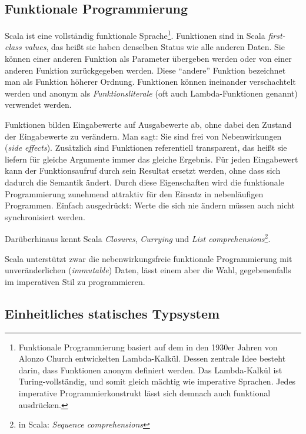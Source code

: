 \documentclass[a4paper, 12pt, hidelinks, listof=totoc, listoftables=totoc, bibliography=totoc]{scrreprt}
\begin{document}
\subsection{Funktionale Programmierung}


Scala ist eine vollständig funktionale Sprache\footnote{Funktionale Programmierung basiert auf dem in den 1930er Jahren von Alonzo Church entwickelten Lambda-Kalkül. Dessen zentrale Idee besteht darin, dass Funktionen anonym definiert werden. Das Lambda-Kalkül ist Turing-vollständig, und somit gleich mächtig wie imperative Sprachen. Jedes imperative Programmierkonstrukt lässt sich demnach auch funktional ausdrücken.}. Funktionen sind in Scala \textit{first-class values}, das heißt sie haben denselben Status wie alle anderen Daten. Sie können einer anderen Funktion als Parameter übergeben werden oder von einer anderen Funktion zurückgegeben werden. Diese "`andere"' Funktion bezeichnet man als Funktion höherer Ordnung. Funktionen können ineinander verschachtelt werden und anonym als \textit{Funktionsliterale} (oft auch Lambda-Funktionen genannt) verwendet werden.

Funktionen bilden Eingabewerte auf Ausgabewerte ab, ohne dabei den Zustand der Eingabewerte zu verändern. Man sagt: Sie sind frei von Nebenwirkungen (\textit{side effects}). Zusätzlich sind Funktionen referentiell transparent, das heißt sie liefern für gleiche Argumente immer das gleiche Ergebnis. Für jeden Eingabewert kann der Funktionsaufruf durch sein Resultat ersetzt werden, ohne dass sich dadurch die Semantik ändert. Durch diese Eigenschaften wird die funktionale Programmierung zunehmend attraktiv für den Einsatz in nebenläufigen Programmen. Einfach ausgedrückt: Werte die sich nie ändern müssen auch nicht synchronisiert werden.

Darüberhinaus kennt Scala \textit{Closures}, \textit{Currying} und \textit{List comprehensions}\footnote{in Scala: \textit{Sequence comprehensions}}.

Scala unterstützt zwar die nebenwirkungsfreie funktionale Programmierung mit unveränderlichen (\textit{immutable}) Daten, lässt einem aber die Wahl, gegebenenfalls im imperativen Stil zu programmieren.\cite[S. 6 ff.]{piepmeyer2010.GFP}\cite[S. 10 ff.]{odersky2008.PIS}

\subsection{Einheitliches statisches Typsystem}
\end{document}
